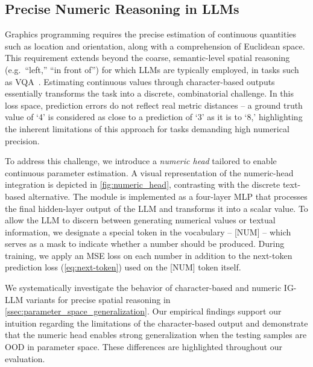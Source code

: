 \subsection{Precise Numeric Reasoning in LLMs}\label{ssec:numeric_head}

Graphics programming requires the precise estimation of continuous quantities such as location and orientation, along with a comprehension of Euclidean space.
This requirement extends beyond the coarse, semantic-level spatial reasoning (e.g.~``left,'' ``in front of'') for which LLMs are typically employed, in tasks such as VQA~\citep{Antol_2015_ICCV}.
Estimating continuous values through character-based outputs essentially transforms the task into a discrete, combinatorial challenge.
In this loss space, prediction errors do not reflect real metric distances -- a ground truth value of `4' is considered as close to a prediction of `3' as it is to `8,' highlighting the inherent limitations of this approach for tasks demanding high numerical precision.

To address this challenge, we introduce a \emph{numeric head} tailored to enable continuous parameter estimation.
A visual representation of the numeric-head integration is depicted in \cref{fig:numeric_head}, contrasting with the discrete text-based alternative.
The module is implemented as a four-layer MLP that processes the final hidden-layer output of the LLM and transforms it into a scalar value.
To allow the LLM to discern between generating numerical values or textual information, we designate a special token in the vocabulary -- [NUM] -- which serves as a mask to indicate whether a number should be produced.
During training, we apply an MSE loss on each number in addition to the next-token prediction loss (\cref{eq:next-token}) used on the [NUM] token itself.

We systematically investigate the behavior of character-based and numeric IG-LLM variants for precise spatial reasoning in \cref{ssec:parameter_space_generalization}.
Our empirical findings support our intuition regarding the limitations of the character-based output and demonstrate that the numeric head enables strong generalization when the testing samples are OOD in parameter space.
These differences are highlighted throughout our evaluation.